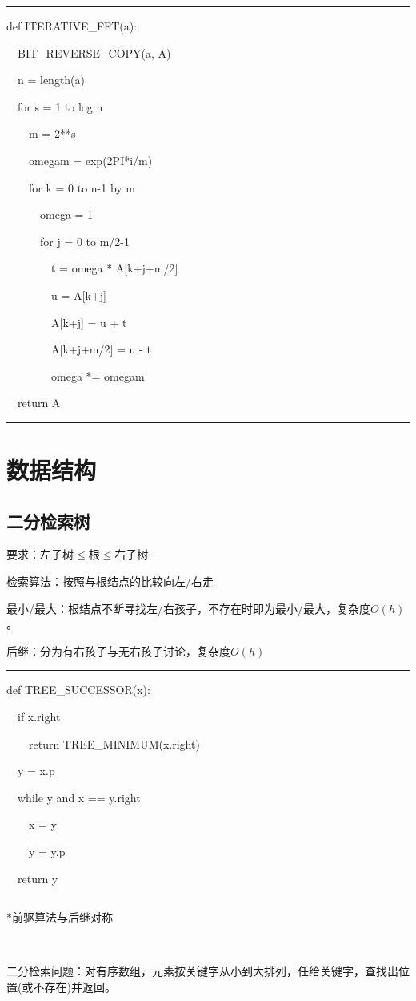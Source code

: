 \documentclass[a4paper,UTF8,fontset=windows]{ctexart}
\newenvironment{code}{\rule{36em}{0.1em}\setlength{\parindent}{1em}

}{

\setlength{\parindent}{0em}\rule{36em}{0.1em}}
\begin{document}
\begin{code}
def ITERATIVE\_FFT(a):

\ \ BIT\_REVERSE\_COPY(a, A)

\ \ n = length(a)

\ \ for s = 1 to log n

\ \ \ \ m = 2**s

\ \ \ \ omegam = exp(2PI*i/m)

\ \ \ \ for k = 0 to n-1 by m

\ \ \ \ \ \ omega = 1

\ \ \ \ \ \ for j = 0 to m/2-1

\ \ \ \ \ \ \ \ t = omega * A[k+j+m/2]

\ \ \ \ \ \ \ \ u = A[k+j]

\ \ \ \ \ \ \ \ A[k+j] = u + t

\ \ \ \ \ \ \ \ A[k+j+m/2] = u - t

\ \ \ \ \ \ \ \ omega *= omegam

\ \ return A
\end{code}

\section{数据结构}
\subsection{二分检索树}
要求：左子树$\le$根$\le$右子树

检索算法：按照与根结点的比较向左/右走

最小/最大：根结点不断寻找左/右孩子，不存在时即为最小/最大，复杂度$O(h)$。

后继：分为有右孩子与无右孩子讨论，复杂度$O(h)$

\begin{code}
def TREE\_SUCCESSOR(x):

\ \ if x.right

\ \ \ \ return TREE\_MINIMUM(x.right)

\ \ y = x.p

\ \ while y and x == y.right

\ \ \ \ x = y

\ \ \ \ y = y.p

\ \ return y
\end{code}

*\hspace{0em}前驱算法与后继对称

\

二分检索问题：对有序数组，元素按关键字从小到大排列，任给关键字，查找出位置(或不存在)并返回。
\end{document}

